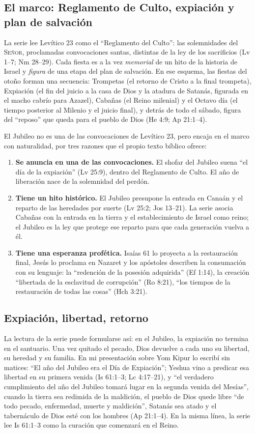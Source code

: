 \documentclass[11pt,letterpaper]{article}
\newcommand{\SENOR}{\textsc{Señor}}
\begin{document}
\subsection{El marco: Reglamento de Culto, expiación y plan de salvación}
La serie lee Levítico 23 como el ``Reglamento del Culto'': las solemnidades del \SENOR, proclamadas convocaciones santas, distintas de la ley de los sacrificios (Lv 1--7; Nm 28--29). Cada fiesta es a la vez \emph{memorial} de un hito de la historia de Israel y \emph{figura} de una etapa del plan de salvación. En ese esquema, las fiestas del otoño forman una secuencia: Trompetas (el retorno de Cristo a la final trompeta), Expiación (el fin del juicio a la casa de Dios y la atadura de Satanás, figurada en el macho cabrío para Azazel), Cabañas (el Reino milenial) y el Octavo día (el tiempo posterior al Milenio y el juicio final), y detrás de todo el sábado, figura del ``reposo'' que queda para el pueblo de Dios (He 4:9; Ap 21:1--4).

El Jubileo no es una de las convocaciones de Levítico 23, pero encaja en el marco con naturalidad, por tres razones que el propio texto bíblico ofrece:
\begin{enumerate}\setlength{\itemsep}{1pt}
\item \textbf{Se anuncia en una de las convocaciones.} El shofar del Jubileo suena ``el día de la expiación'' (Lv 25:9), dentro del Reglamento de Culto. El año de liberación nace de la solemnidad del perdón.
\item \textbf{Tiene un hito histórico.} El Jubileo presupone la entrada en Canaán y el reparto de las heredades por suerte (Lv 25:2; Jos 13--21). La serie asocia Cabañas con la entrada en la tierra y el establecimiento de Israel como reino; el Jubileo es la ley que protege ese reparto para que cada generación vuelva a él.
\item \textbf{Tiene una esperanza profética.} Isaías 61 lo proyecta a la restauración final, Jesús lo proclama en Nazaret y los apóstoles describen la consumación con su lenguaje: la ``redención de la posesión adquirida'' (Ef 1:14), la creación ``libertada de la esclavitud de corrupción'' (Ro 8:21), ``los tiempos de la restauración de todas las cosas'' (Hch 3:21).
\end{enumerate}

\subsection{Expiación, libertad, retorno}
La lectura de la serie puede formularse así: en el Jubileo, la expiación no termina en el santuario. Una vez quitado el pecado, Dios devuelve a cada uno su libertad, su heredad y su familia. En mi presentación sobre Yom Kipur lo escribí sin matices: ``El año del Jubileo era el Día de Expiación''; Yeshua vino a predicar esa libertad en su primera venida (Is 61:1--3; Lc 4:17--21), y ``el verdadero cumplimiento del año del Jubileo tomará lugar en la segunda venida del Mesías'', cuando la tierra sea redimida de la maldición, el pueblo de Dios quede libre ``de todo pecado, enfermedad, muerte y maldición'', Satanás sea atado y el tabernáculo de Dios esté con los hombres (Ap 21:1--4). En la misma línea, la serie lee Is 61:1--3 como la curación que comenzará en el Reino.
\end{document}
